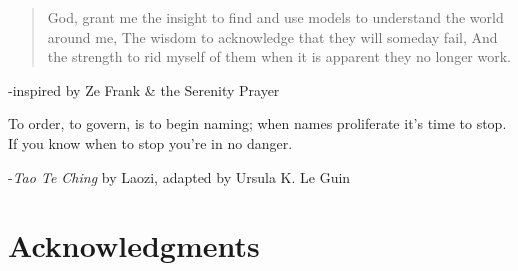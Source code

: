 % 

\clearpage
\hspace{0pt}
\vfill
\blockquote{\footnotesize
 God, grant me the insight to find and use models to understand the world around me, \newline The wisdom to acknowledge that they will someday fail, \newline And the strength to rid myself of them when it is apparent they no longer work.}

\hspace{40mm}-inspired by Ze Frank \& the Serenity Prayer

\vfill

\begin{singlespace}
\footnotesize   
\hspace*{52mm} To order, to govern, \newline
\hspace*{59mm} is to begin naming; \newline
\hspace*{55mm} when names proliferate \newline
\hspace*{60mm} it's time to stop. \newline
\hspace*{54mm} If you know when to stop \newline
\hspace*{59mm} you're in no danger. \newline
\end{singlespace}


\hspace{40mm}-\textit{Tao Te Ching} by Laozi, adapted by Ursula K. Le Guin


\normalsize
\vfill
\hspace{0pt}

\cleardoublepage

\section*{Acknowledgments}

